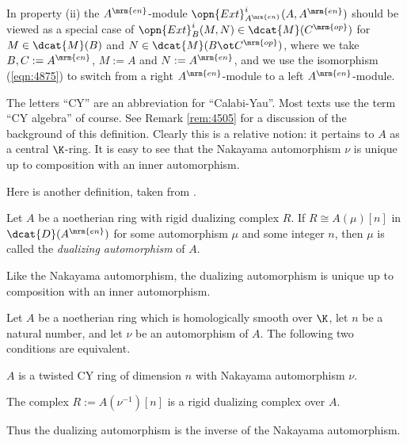 In property (ii) the $A^{\mrm{en}}$-module 
$\opn{Ext}^i_{A^{\mrm{en}}}(A, A^{\mrm{en}})$
should be viewed as a special case of 
$\opn{Ext}^i_{B}(M, N) \in \dcat{M}(C^{\mrm{op}})$ 
for $M \in \dcat{M}(B)$ and $N \in \dcat{M}(B \ot C^{\mrm{op}})$,
where we take $B, C := A^{\mrm{en}}$, $M := A$ and 
$N := A^{\mrm{en}}$, and we use the isomorphism (\ref{eqn:4875}) to switch
from a right $A^{\mrm{en}}$-module to a left $A^{\mrm{en}}$-module. 

The letters ``CY'' are an abbreviation for ``Calabi-Yau''. 
Most texts use the term ``CY algebra'' of course. See Remark 
\ref{rem:4505} for a discussion of the background of this definition. 
Clearly this is a relative notion: it pertains to $A$ as a central $\K$-ring. 
It is easy to see that the Nakayama automorphism 
$\nu$ is unique up to composition with an inner automorphism. 

Here is another definition, taken from \cite{Ye4.5}. 

\begin{dfn} \label{dfn:4875}
Let $A$ be a noetherian ring with rigid dualizing complex $R$. If 
$R \cong A(\mu)[n]$ in $\dcat{D}(A^{\mrm{en}})$ for some 
automorphism $\mu$ and some integer $n$, then $\mu$ is 
called the {\em dualizing automorphism} of $A$. 
\end{dfn}

Like the Nakayama automorphism, the dualizing automorphism is unique up to 
composition with an inner automorphism.  

\begin{prop} \label{prop:4900}  
Let $A$ be a noetherian ring which is homologically smooth over $\K$, let $n$ 
be a natural number, and let $\nu$ be an automorphism of $A$. 
The following two conditions are equivalent. 
\begin{enumerate}
 $A$ is a twisted CY ring of dimension $n$ with Nakayama automorphism 
$\nu$. 

 The complex $R := A(\nu^{-1})[n]$ is a rigid dualizing complex over 
$A$. 
\end{enumerate}
\end{prop}

Thus the dualizing automorphism is the inverse of the Nakayama automorphism.

